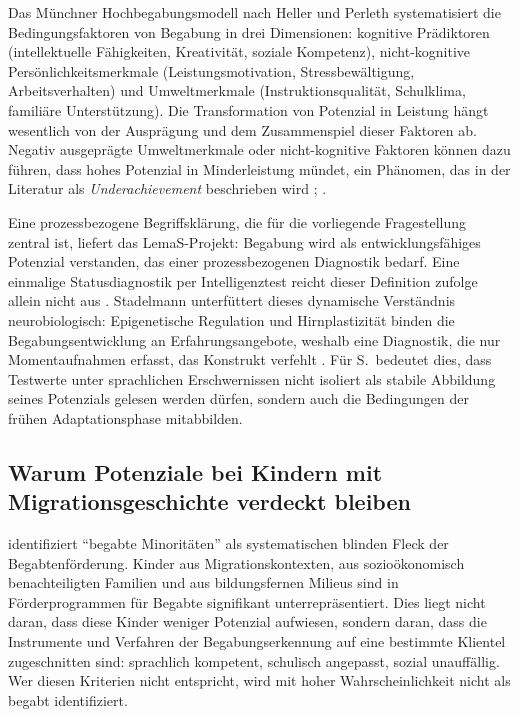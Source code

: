 \documentclass[ngerman, a4paper]{article}
\begin{document}
Das Münchner Hochbegabungsmodell nach Heller und Perleth systematisiert die
Bedingungsfaktoren von Begabung in drei Dimensionen: kognitive Prädiktoren
(intellektuelle Fähigkeiten, Kreativität, soziale Kompetenz), nicht-kognitive
Persönlichkeitsmerkmale (Leistungsmotivation, Stressbewältigung, Arbeitsverhalten) und
Umweltmerkmale (Instruktionsqualität, Schulklima, familiäre Unterstützung). Die
Transformation von Potenzial in Leistung hängt wesentlich von der Ausprägung und dem
Zusammenspiel dieser Faktoren ab. Negativ ausgeprägte Umweltmerkmale oder
nicht-kognitive Faktoren können dazu führen, dass hohes Potenzial in
Minderleistung mündet, ein Phänomen, das in der Literatur als
\textit{Underachievement} beschrieben wird
\parencite[Kap.\,2.2]{preckel2013hochbegabung};
\parencite[S.\,242--253]{fischer2020begabungsfoerderung}.

Eine prozessbezogene Begriffsklärung, die für die vorliegende Fragestellung
zentral ist, liefert das LemaS-Projekt: Begabung wird als entwicklungsfähiges
Potenzial verstanden, das einer prozessbezogenen Diagnostik bedarf. Eine
einmalige Statusdiagnostik per Intelligenztest reicht dieser Definition
zufolge allein nicht aus \parencite{lemas2023begriffsklaerung}. Stadelmann
unterfüttert dieses dynamische Verständnis neurobiologisch: Epigenetische
Regulation und Hirnplastizität binden die Begabungsentwicklung an
Erfahrungsangebote, weshalb eine Diagnostik, die nur Momentaufnahmen
erfasst, das Konstrukt verfehlt
\parencite[S.\,133--147]{stadelmann2021begabungsentwicklung}. 
Für S.\ bedeutet dies, dass
Testwerte unter sprachlichen Erschwernissen nicht isoliert als stabile
Abbildung seines Potenzials gelesen werden dürfen, sondern auch die
Bedingungen der frühen Adaptationsphase mitabbilden.

\subsection{Warum Potenziale bei Kindern mit Migrationsgeschichte verdeckt bleiben}

\textcite[S.\,576--587]{stamm2021fehlenderblick} identifiziert \enquote{begabte Minoritäten} als systematischen blinden Fleck der
Begabtenförderung. Kinder aus Migrationskontexten, aus sozioökonomisch benachteiligten
Familien und aus bildungsfernen Milieus sind in Förderprogrammen für Begabte signifikant
unterrepräsentiert. Dies liegt nicht daran, dass diese Kinder weniger Potenzial aufwiesen,
sondern daran, dass die Instrumente und Verfahren der Begabungserkennung auf eine
bestimmte Klientel zugeschnitten sind: sprachlich kompetent, schulisch angepasst,
sozial unauffällig. Wer diesen Kriterien nicht
entspricht, wird mit hoher Wahrscheinlichkeit nicht als begabt identifiziert.
\end{document}

